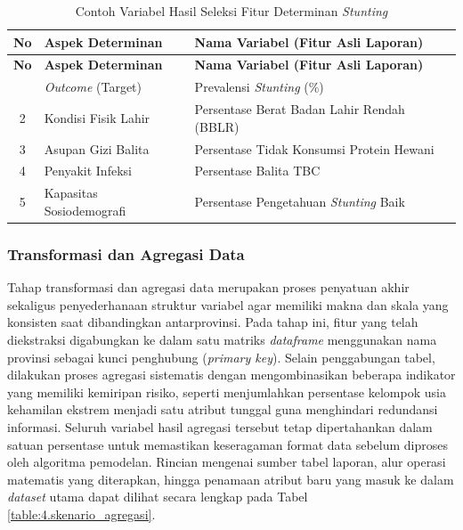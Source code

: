 \begin{longtable}{|c|p{}|p{}|}
    \caption{Contoh Variabel Hasil Seleksi Fitur Determinan \textit{Stunting}}
    \label{tabel:4.seleksi_fitur}\\
    \hline
    \centering\textbf{No} & \centering\textbf{Aspek Determinan} & \textbf{Nama Variabel (Fitur Asli Laporan)} \\ 
    \hline
    \endfirsthead
    \hline
    \centering\textbf{No} & \centering\textbf{Aspek Determinan} & \textbf{Nama Variabel (Fitur Asli Laporan)} \\ 
    \hline
    \endhead
    \hline
    \endfoot
    \hline
    \endlastfoot
    1 & \textit{Outcome} (Target) & Prevalensi \textit{Stunting} (\%)\\ 
    \hline
    2 & Kondisi Fisik Lahir & Persentase Berat Badan Lahir Rendah (BBLR) \\
    \hline
    3 & Asupan Gizi Balita & Persentase Tidak Konsumsi Protein Hewani \\
    \hline
    4 & Penyakit Infeksi & Persentase Balita TBC \\
    \hline
    5 & Kapasitas Sosiodemografi & Persentase Pengetahuan \textit{Stunting} Baik \\
    \hline
\end{longtable}

\subsubsection{Transformasi dan Agregasi Data}
Tahap transformasi dan agregasi data merupakan proses penyatuan akhir sekaligus penyederhanaan struktur variabel agar memiliki makna dan skala yang konsisten saat dibandingkan antarprovinsi. Pada tahap ini, fitur yang telah diekstraksi digabungkan ke dalam satu matriks \textit{dataframe} menggunakan nama provinsi sebagai kunci penghubung (\textit{primary key}). Selain penggabungan tabel, dilakukan proses agregasi sistematis dengan mengombinasikan beberapa indikator yang memiliki kemiripan risiko, seperti menjumlahkan persentase kelompok usia kehamilan ekstrem menjadi satu atribut tunggal guna menghindari redundansi informasi. Seluruh variabel hasil agregasi tersebut tetap dipertahankan dalam satuan persentase untuk memastikan keseragaman format data sebelum diproses oleh algoritma pemodelan. Rincian mengenai sumber tabel laporan, alur operasi matematis yang diterapkan, hingga penamaan atribut baru yang masuk ke dalam \textit{dataset} utama dapat dilihat secara lengkap pada Tabel \ref{table:4.skenario_agregasi}.

